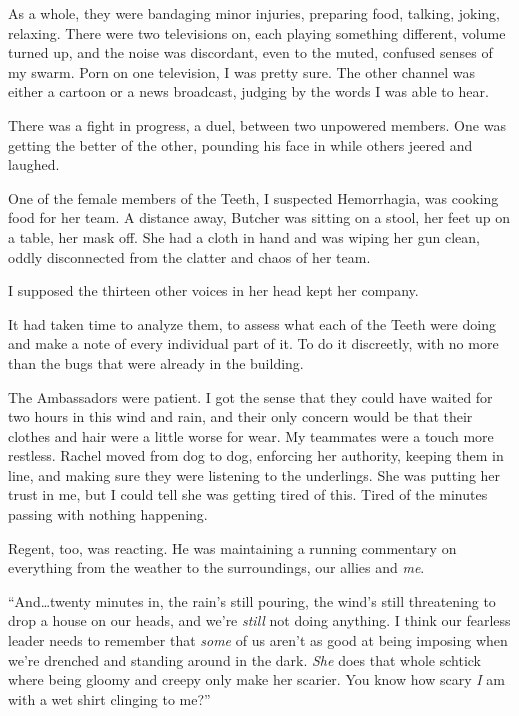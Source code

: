 As a whole, they were bandaging minor injuries, preparing food, talking, joking, relaxing.  There were two televisions on, each playing something different, volume turned up, and the noise was discordant, even to the muted, confused senses of my swarm.  Porn on one television, I was pretty sure.  The other channel was either a cartoon or a news broadcast, judging by the words I was able to hear.



There was a fight in progress, a duel, between two unpowered members.  One was getting the better of the other, pounding his face in while others jeered and laughed.



One of the female members of the Teeth, I suspected Hemorrhagia, was cooking food for her team.  A distance away, Butcher was sitting on a stool, her feet up on a table, her mask off.  She had a cloth in hand and was wiping her gun clean, oddly disconnected from the clatter and chaos of her team.



I supposed the thirteen other voices in her head kept her company.



It had taken time to analyze them, to assess what each of the Teeth were doing and make a note of every individual part of it.  To do it discreetly, with no more than the bugs that were already in the building.



The Ambassadors were patient.  I got the sense that they could have waited for two hours in this wind and rain, and their only concern would be that their clothes and hair were a little worse for wear.  My teammates were a touch more restless.  Rachel moved from dog to dog, enforcing her authority, keeping them in line, and making sure they were listening to the underlings.  She was putting her trust in me, but I could tell she was getting tired of this.  Tired of the minutes passing with nothing happening.



Regent, too, was reacting.  He was maintaining a running commentary on everything from the weather to the surroundings, our allies and \emph{me}.



``And\ldots twenty minutes in, the rain's still pouring, the wind's still threatening to drop a house on our heads, and we're \emph{still} not doing anything.  I think our fearless leader needs to remember that \emph{some} of us aren't as good at being imposing when we're drenched and standing around in the dark.  \emph{She }does that whole schtick where being gloomy and creepy only make her scarier.  You know how scary \emph{I} am with a wet shirt clinging to me?''



